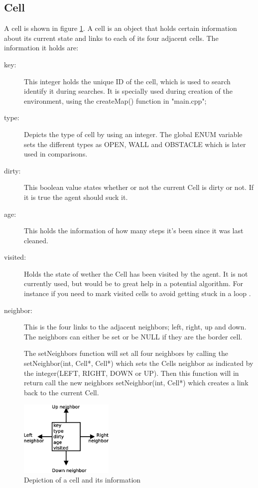 \subsection{Cell}
A cell is shown in figure \ref{fig:cell}. A cell is an object that holds
certain information about its current state and links to each of its four
adjacent cells.  The information it holds are:
\begin{description}
\item[key:] 
This integer holds the unique ID of the cell, which is used to search identify 
it during searches. It is specially used during creation of the environment, 
using the createMap() function in "main.cpp";

\item[type:]
Depicts the type of cell by using an integer.  The global ENUM variable sets the
different types as OPEN, WALL and OBSTACLE which is later used in comparisons.

\item[dirty:]
This boolean value states whether or not the current Cell is dirty or not. If it
is true the agent should suck it.

\item[age:]
This holds the information of how many steps it's been since it was last
cleaned.

\item[visited:]
Holds the state of wether the Cell has been visited by the agent. It is not
currently used, but would be to great help in a potential algorithm. For
instance if you need to mark visited cells to avoid getting stuck in a loop .

\item[neighbor:]
This is the four links to the adjacent neighbors; left, right, up and down. The
neighbors can either be set or be NULL if they are the border cell.

The setNeighbors function will set all four neighbors by calling the
setNeighbor(int, Cell*, Cell*) which sets the Cells neighbor as indicated by the
integer(LEFT, RIGHT, DOWN or UP).  Then this function will in return call the
new neighbors setNeighbor(int, Cell*) which creates a link back to the current
Cell.
\end{description}

\begin{figure}[h] \label{fig:cell}	\centering
\includegraphics[width=0.4\textwidth]{cell}
\caption{Depiction of a cell and its information}
\end{figure}


